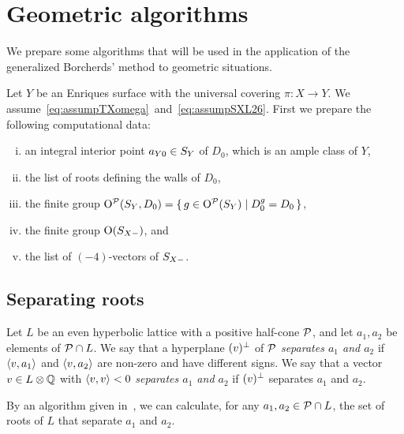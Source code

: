 \documentclass{amsart}
\numberwithin{procedure}{section}
\begin{document}
\section{Geometric algorithms}\label{sec:geomalgo}
%
%
We prepare some algorithms that will be used in the application of
 the generalized Borcherds' method to geometric situations.
  \par
 Let $Y$ be an Enriques surface 
 with the universal covering $\pi\colon X\to Y$.
 We assume~\eqref{eq:assumpTXomega}~and~\eqref{eq:assumpSXL26}.
First we prepare the following computational data:
%
\begin{enumerate}[(i)]
\item an integral interior point $a_{Y0}\in S_{Y}$ of $D_0$, which is an ample class of $Y$, 
\item the list of roots defining the walls of $D_0$, 
\item the finite group $\mathord{\mathrm{O}}^{\mathord{\mathcal P}}(S_{Y}, D_0)=\{\,{g\in \mathord{\mathrm{O}}^{\mathord{\mathcal P}}(S_{Y})}\mid {D_0^g=D_0} \,\}$, 
\item the finite group $\mathord{\mathrm{O}}(S_{X-})$, and
\item the list of $(-4)$-vectors of $S_{X-}$.
\end{enumerate}
%
\subsection{Separating roots}\label{subsec:separating}
%
\begin{definition}
Let $L$ be an even  hyperbolic lattice with a positive half-cone $\mathord{\mathcal P}$, and
let $a_1, a_2$ be elements of $\mathord{\mathcal P}\cap L$.
We say that a hyperplane $(v)\sp{\perp}$ of $\mathord{\mathcal P}$
\emph{separates $a_1$ and $a_2$}
if $\langle v, a_1 \rangle$ and $\langle v, a_2 \rangle$ are non-zero and have different signs.
We say that a vector $v\in L\otimes\mathord{\mathbb Q}$
with $\langle v, v \rangle<0$ \emph{separates $a_1$ and $a_2$}
if $(v)\sp{\perp}$ separates $a_1$ and $a_2$.
\end{definition}
%
By an algorithm given in~\cite{ShimadaChar5},
we can calculate, for any $a_1, a_2\in \mathord{\mathcal P}\cap L$, 
 the set of roots of $L$ that
separate $a_1$ and $a_2$.
%
\end{document}
